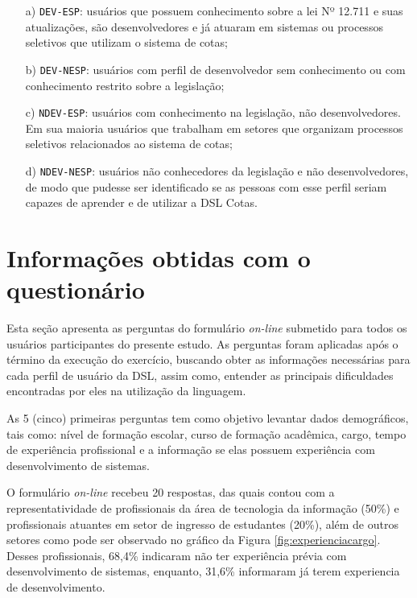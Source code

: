 \begin{enumerate}
    \item[a)] \texttt{DEV-ESP}: usuários que possuem conhecimento sobre a lei Nº 12.711 e suas atualizações, são desenvolvedores e já atuaram em sistemas ou processos seletivos que utilizam o sistema de cotas;
    \item[b)] \texttt{DEV-NESP}: usuários com perfil de desenvolvedor sem conhecimento ou com conhecimento restrito sobre a legislação;
    \item[c)] \texttt{NDEV-ESP}: usuários com conhecimento na legislação, não desenvolvedores. Em sua maioria usuários que trabalham em setores que organizam processos seletivos relacionados ao sistema de cotas;
    \item[d)] \texttt{NDEV-NESP}: usuários não conhecedores da legislação e não desenvolvedores, de modo que pudesse ser identificado se as pessoas com esse perfil seriam capazes de aprender e de utilizar a DSL Cotas.
\end{enumerate}

\section{Informações obtidas com o questionário}
\label{sec:perguntasaplicadas}

Esta seção apresenta as perguntas do formulário \textit{on-line} submetido para todos os usuários participantes do presente estudo. As perguntas foram aplicadas após o término da execução do exercício, buscando obter as informações necessárias para cada perfil de usuário da DSL, assim como, entender as principais dificuldades encontradas por eles na utilização da linguagem.

As 5 (cinco) primeiras perguntas tem como objetivo levantar dados demográficos, tais como: nível de formação escolar, curso de formação acadêmica, cargo, tempo de experiência profissional e a informação se elas possuem experiência com desenvolvimento de sistemas.

O formulário \textit{on-line} recebeu 20 respostas, das quais contou com a representatividade de profissionais da área de tecnologia da informação (50\%) e profissionais atuantes em setor de ingresso de estudantes (20\%), além de outros setores como pode ser observado no gráfico da Figura \ref{fig:experienciacargo}. Desses profissionais, 68,4\% indicaram não ter experiência prévia com desenvolvimento de sistemas, enquanto, 31,6\% informaram já terem experiencia de desenvolvimento.

